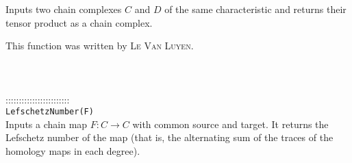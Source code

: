 \documentclass[a4paper,11pt]{report}
\begin{document}
{ Inputs two chain complexes $C$ and $D$ of the same characteristic and returns their tensor product as a chain
complex. 

 This function was written by \textsc{ Le Van Luyen}. \\
 \\
 \\
 \\
 ::::::::::::::::::::::::\\
 \texttt{LefschetzNumber(F)}\\
 

 Inputs a chain map $F\colon C\rightarrow C$ with common source and target. It returns the Lefschetz number of the map
(that is, the alternating sum of the traces of the homology maps in each
degree). \\
 \\
 \\
 }

 
\end{document}
